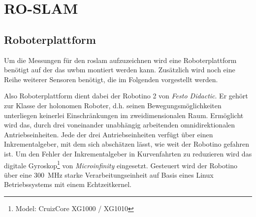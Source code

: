 \begin{comment}
------------------------------------------------------------------------------------------
- \cite{kurth2003experimental}
	- Numerically, we can evaluate the performance of the dead reckoning and Kalman Filter localization methods by considering the cross-track error (XTE). That is, for each pose we measure how far left or right of the true position our estimation is, orthogonal to the true heading. We compile these errors for every point along the path, then and the maximum value along with the mean and standard deviation of the errors to produce the evaluative statistics in Table 1.
	- https://de.wikipedia.org/wiki/Querabweichung
- Diagramme
	- \cite{kurth2003experimental}
		- Fig. 5: (1) The ground truth path with tags indicated by circles. The numbers indicate how many range measurements were received from each tag over the duration of Test 1. (2) The path estimate from dead reckoning alone. (3) The path estimate from localization using a Kalman Filter. The Filter fuses data from odometry and a gyro with absolute measurements from RF tags to produce this path estimate. Numerical results are given in Table 1. (X: position in x(m), Y: position in y(m), Ground truth path with tag locations, Dead reckoning path, Kalman filter localization path)
\end{comment}
\chapter{RO-SLAM}\label{ch:ro_slam}


\begin{comment}
--------------------------------------------------------------------------------
- Einsatz mobiler Roboter in der Logistik am Beispiel des Robotino
	- http://www.r-moehrle.de/wissenschaftlicheArbeiten/robotino1.pdf
\end{comment}
\section{Roboterplattform}

Um die Messungen für den \Gls{roslam} aufzuzeichnen wird eine Roboterplattform benötigt auf der das \Gls{uwbm} montiert werden kann. Zusätzlich wird noch eine Reihe weiterer Sensoren benötigt, die im Folgenden vorgestellt werden.

Also Roboterplattform dient dabei der Robotino 2 von \textit{Festo Didactic}. Er gehört zur Klasse der holonomen Roboter, d.h. seinen Bewegungsmöglichkeiten unterliegen keinerlei Einschränkungen im zweidimensionalen Raum. Ermöglicht wird das, durch drei voneinander unabhängig arbeitenden omnidirektionalen Antriebseinheiten. Jede der drei Antriebseinheiten verfügt über einen Inkrementalgeber, mit dem sich abschätzen lässt, wie weit der Robotino gefahren ist. Um den Fehler der Inkrementalgeber in Kurvenfahrten zu reduzieren wird das digitale Gyroskop\footnote{Model: CruizCore XG1000 / XG1010} von \textit{Microinfinity} eingesetzt. Gesteuert wird der Robotino über eine \SI{300}{\MHz} starke Verarbeitungseinheit auf Basis eines Linux Betriebssystems mit einem Echtzeitkernel. \cite{festo2007robotinomanual}

